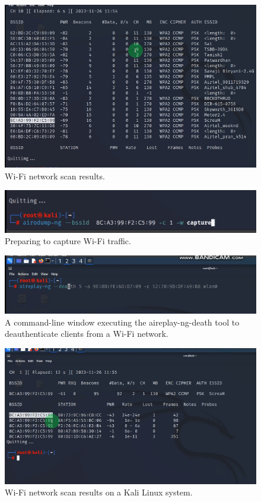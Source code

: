 \documentclass[11pt]{article}
\begin{document}
\begin{figure}[H]
	\centering
	\includegraphics[width=.95\textwidth]{06.png}
	\caption{Wi-Fi network scan results.}
\end{figure}

\begin{figure}[H]
	\centering
	\includegraphics[width=.95\textwidth]{07.png}
	\caption{Preparing to capture Wi-Fi traffic.}
\end{figure}

\begin{figure}[H]
	\centering
	\includegraphics[width=.95\textwidth]{08.png}
	\caption{A command-line window executing the aireplay-ng-death tool to deauthenticate clients from a Wi-Fi network. }
\end{figure}

\begin{figure}[H]
	\centering
	\includegraphics[width=.95\textwidth]{09.png}
	\caption{Wi-Fi network scan results on a Kali Linux system.	}
\end{figure}
\end{document}
